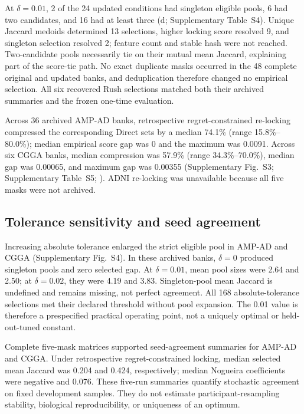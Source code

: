 At \(\delta=0.01\), 2 of the 24 updated conditions had singleton eligible pools, 6 had two candidates, and 16 had at least three (d; Supplementary Table~S4). Unique Jaccard medoids determined 13 selections, higher locking score resolved 9, and singleton selection resolved 2; feature count and stable hash were not reached. Two-candidate pools necessarily tie on their mutual mean Jaccard, explaining part of the score-tie path. No exact duplicate masks occurred in the 48 complete original and updated banks, and deduplication therefore changed no empirical selection. All six recovered Rush selections matched both their archived summaries and the frozen one-time evaluation.

Across 36 archived AMP-AD banks, retrospective regret-constrained re-locking compressed the corresponding Direct sets by a median 74.1\% (range 15.8\%--80.0\%); median empirical score gap was 0 and the maximum was 0.0091. Across six CGGA banks, median compression was 57.9\% (range 34.3\%--70.0\%), median gap was 0.00065, and maximum gap was 0.00355 (Supplementary Fig.~S3; Supplementary Table~S5; ). ADNI re-locking was unavailable because all five masks were not archived.



\subsection{Tolerance sensitivity and seed agreement}

Increasing absolute tolerance enlarged the strict eligible pool in AMP-AD and CGGA (Supplementary Fig.~S4). In these archived banks, \(\delta=0\) produced singleton pools and zero selected gap. At \(\delta=0.01\), mean pool sizes were 2.64 and 2.50; at \(\delta=0.02\), they were 4.19 and 3.83. Singleton-pool mean Jaccard is undefined and remains missing, not perfect agreement. All 168 absolute-tolerance selections met their declared threshold without pool expansion. The 0.01 value is therefore a prespecified practical operating point, not a uniquely optimal or held-out-tuned constant.

Complete five-mask matrices supported seed-agreement summaries for AMP-AD and CGGA. Under retrospective regret-constrained locking, median selected mean Jaccard was 0.204 and 0.424, respectively; median Nogueira coefficients were negative and 0.076. These five-run summaries quantify stochastic agreement on fixed development samples. They do not estimate participant-resampling stability, biological reproducibility, or uniqueness of an optimum.

